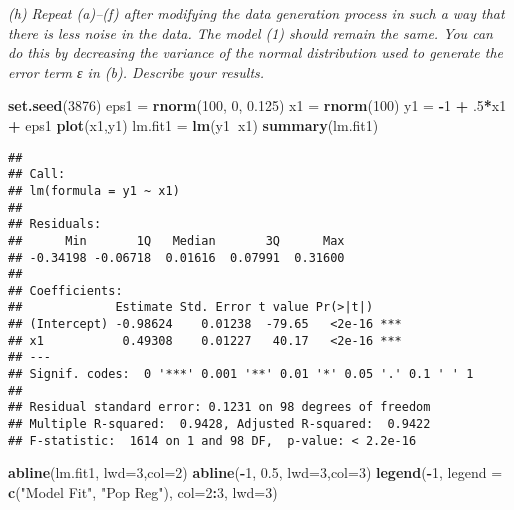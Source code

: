 \documentclass[]{article}
\newenvironment{Shaded}{\begin{snugshade}}{\end{snugshade}}
\newcommand{\KeywordTok}[1]{\textcolor[rgb]{0.13,0.29,0.53}{\textbf{#1}}}
\newcommand{\DataTypeTok}[1]{\textcolor[rgb]{0.13,0.29,0.53}{#1}}
\newcommand{\DecValTok}[1]{\textcolor[rgb]{0.00,0.00,0.81}{#1}}
\newcommand{\FloatTok}[1]{\textcolor[rgb]{0.00,0.00,0.81}{#1}}
\newcommand{\StringTok}[1]{\textcolor[rgb]{0.31,0.60,0.02}{#1}}
\newcommand{\OperatorTok}[1]{\textcolor[rgb]{0.81,0.36,0.00}{\textbf{#1}}}
\newcommand{\NormalTok}[1]{#1}
\begin{document}
 \emph{(h) Repeat (a)--(f) after modifying the data generation process
in such a way that there is less noise in the data. The model (1) should
remain the same. You can do this by decreasing the variance of the
normal distribution used to generate the error term ε in (b). Describe
your results.}

\begin{Shaded}
\begin{Highlighting}[]
\KeywordTok{set.seed}\NormalTok{(}\DecValTok{3876}\NormalTok{)}
\NormalTok{eps1 =}\StringTok{ }\KeywordTok{rnorm}\NormalTok{(}\DecValTok{100}\NormalTok{, }\DecValTok{0}\NormalTok{, }\FloatTok{0.125}\NormalTok{)}
\NormalTok{x1 =}\StringTok{ }\KeywordTok{rnorm}\NormalTok{(}\DecValTok{100}\NormalTok{)}
\NormalTok{y1 =}\StringTok{ }\OperatorTok{-}\DecValTok{1} \OperatorTok{+}\StringTok{ }\NormalTok{.}\DecValTok{5}\OperatorTok{*}\NormalTok{x1 }\OperatorTok{+}\StringTok{ }\NormalTok{eps1}
\KeywordTok{plot}\NormalTok{(x1,y1)}
\NormalTok{lm.fit1 =}\StringTok{ }\KeywordTok{lm}\NormalTok{(y1}\OperatorTok{~}\NormalTok{x1)}
\KeywordTok{summary}\NormalTok{(lm.fit1)}
\end{Highlighting}
\end{Shaded}

\begin{verbatim}
## 
## Call:
## lm(formula = y1 ~ x1)
## 
## Residuals:
##      Min       1Q   Median       3Q      Max 
## -0.34198 -0.06718  0.01616  0.07991  0.31600 
## 
## Coefficients:
##             Estimate Std. Error t value Pr(>|t|)    
## (Intercept) -0.98624    0.01238  -79.65   <2e-16 ***
## x1           0.49308    0.01227   40.17   <2e-16 ***
## ---
## Signif. codes:  0 '***' 0.001 '**' 0.01 '*' 0.05 '.' 0.1 ' ' 1
## 
## Residual standard error: 0.1231 on 98 degrees of freedom
## Multiple R-squared:  0.9428, Adjusted R-squared:  0.9422 
## F-statistic:  1614 on 1 and 98 DF,  p-value: < 2.2e-16
\end{verbatim}

\begin{Shaded}
\begin{Highlighting}[]
\KeywordTok{abline}\NormalTok{(lm.fit1, }\DataTypeTok{lwd=}\DecValTok{3}\NormalTok{,}\DataTypeTok{col=}\DecValTok{2}\NormalTok{)}
\KeywordTok{abline}\NormalTok{(}\OperatorTok{-}\DecValTok{1}\NormalTok{, }\FloatTok{0.5}\NormalTok{, }\DataTypeTok{lwd=}\DecValTok{3}\NormalTok{,}\DataTypeTok{col=}\DecValTok{3}\NormalTok{)}
\KeywordTok{legend}\NormalTok{(}\OperatorTok{-}\DecValTok{1}\NormalTok{, }\DataTypeTok{legend =} \KeywordTok{c}\NormalTok{(}\StringTok{"Model Fit"}\NormalTok{, }\StringTok{"Pop Reg"}\NormalTok{), }\DataTypeTok{col=}\DecValTok{2}\OperatorTok{:}\DecValTok{3}\NormalTok{, }\DataTypeTok{lwd=}\DecValTok{3}\NormalTok{)}
\end{Highlighting}
\end{Shaded}
\end{document}
